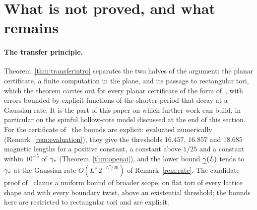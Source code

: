\section{What is not proved, and what remains}\label{sec:outlook}

\paragraph{The transfer principle.} Theorem~\ref{thm:transferintro} separates the two halves of the argument: the planar certificate,
a finite computation in the plane, and its passage to rectangular tori, which the theorem carries out for every planar
certificate of the form of~\cite{OAI:A-Fock-space-inequality-and-the-Laughlin-spectral-gap-September-24-2026}, with errors
bounded by explicit functions of the shorter period that decay at a Gaussian rate. It is the part of this paper on which
further work can build, in particular on the spinful hollow-core model discussed at the end of this section. For the
certificate of~\cite{OAI:A-Fock-space-inequality-and-the-Laughlin-spectral-gap-September-24-2026} the bounds are explicit:
evaluated numerically (Remark~\ref{rem:evaluation}), they give the thresholds $16.457$, $16.857$ and $18.685$ magnetic lengths
for a positive constant, a constant above $1/25$ and a constant within $10^{-5}$ of $\gamma_{*}$ (Theorem~\ref{thm:openai}), and
the lower bound $\underline{\gamma}(L)$ tends to $\gamma_{*}$ at the Gaussian rate $O(L^4\,2^{-L^2/20})$ of Remark~\ref{rem:rate}. The candidate proof of~\cite{HouWu} claims a uniform
bound of broader scope, on flat tori of every lattice shape and with every boundary twist, above an existential threshold;
the bounds here are restricted to rectangular tori and are explicit.

